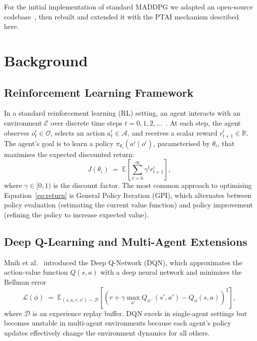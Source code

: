 \documentclass[12pt]{article}
\begin{document}
For the initial implementation of standard MADDPG we adapted an open-source codebase~\cite{git123hub2021}, then rebuilt and extended it with the PTAI mechanism described here.

\section{Background}

\subsection{Reinforcement Learning Framework}

In a standard reinforcement learning (RL) setting, an agent interacts with an environment
$\mathcal{E}$ over discrete time steps $t = 0, 1, 2, \ldots$~\cite{sutton2018reinforcement}.
At each step, the agent observes $o^i_t \in \mathcal{O}$, selects an action
$a^i_t \in \mathcal{A}$, and receives a scalar reward $r^i_{t+1} \in \mathbb{R}$.
The agent's goal is to learn a policy $\pi_{\theta_i}(a^i \mid o^i)$, parameterised by
$\theta_i$, that maximises the expected discounted return:
\begin{equation}
J(\theta_i) \;=\; \mathbb{E}\!\left[\sum_{t=0}^{\infty} \gamma^t r^i_{t+1}\right],
\label{eq:return}
\end{equation}
where $\gamma \in [0, 1)$ is the discount factor. The most common approach to optimising
Equation~\eqref{eq:return} is General Policy Iteration (GPI), which alternates between
policy evaluation (estimating the current value function) and policy improvement (refining
the policy to increase expected value).

\subsection{Deep Q-Learning and Multi-Agent Extensions}

Mnih et al.~\cite{mnih2015human} introduced the Deep Q-Network (DQN), which approximates
the action-value function $Q(s, a)$ with a deep neural network and minimises the Bellman
error
\begin{equation}
\mathcal{L}(\phi) \;=\; \mathbb{E}_{(s,a,r,s') \sim \mathcal{D}}
  \left[\!\left(r + \gamma \max_{a'} Q_{\phi^-}(s', a') - Q_\phi(s, a)\right)^{\!2}\right],
\label{eq:dqn}
\end{equation}
where $\mathcal{D}$ is an experience replay buffer. DQN excels in single-agent settings
but becomes unstable in multi-agent environments because each agent's policy updates
effectively change the environment dynamics for all others.
\end{document}
